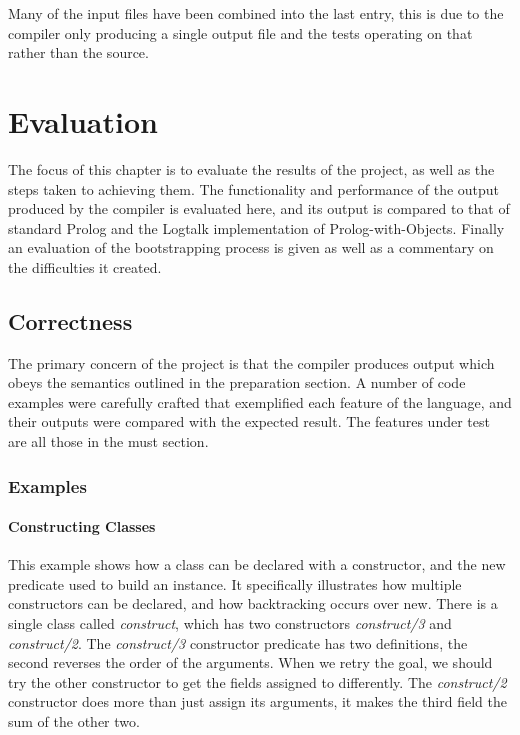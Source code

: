 \documentclass[12pt,a4paper,twoside,openright]{report}
\begin{document}
Many of the input files have been combined into the last entry, this is due to the compiler only producing a single output file and the tests operating on that rather than the source.

\chapter{Evaluation}

The focus of this chapter is to evaluate the results of the project, as well as the steps taken to achieving them. The functionality and performance of the output produced by the compiler is evaluated here, and its output is compared to that of standard Prolog and the Logtalk implementation of Prolog-with-Objects. Finally an evaluation of the bootstrapping process is given as well as a commentary on the difficulties it created.

\section{Correctness}

The primary concern of the project is that the compiler produces output which obeys the semantics outlined in the preparation section. A number of code examples were carefully crafted that exemplified each feature of the language, and their outputs were compared with the expected result. The features under test are all those in the must section.

\subsection{Examples}

	\subsubsection{Constructing Classes}
	
	This example shows how a class can be declared with a constructor, and the new predicate used to build an instance. It specifically illustrates how multiple constructors can be declared, and how backtracking occurs over new. There is a single class called \emph{construct}, which has two constructors \emph{construct/3} and  \emph{construct/2}.  The \emph{construct/3} constructor predicate has two definitions, the second reverses the order of the arguments. When we retry the goal, we should try the other constructor to get the fields assigned to differently. The  \emph{construct/2} constructor does more than just assign its arguments, it makes the third field the sum of the other two.
	
\end{document}
